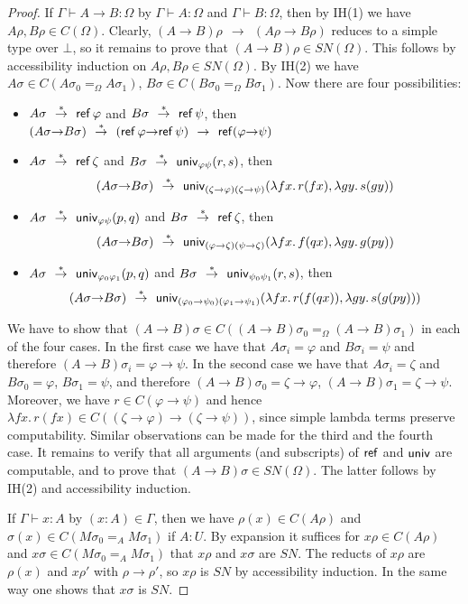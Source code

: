 \documentclass[10pt,a4paper]{article}
\newcommand{\red}{~~{\to}~~}
\newcommand{\unphsi}{{\univ_{\varphi\psi}}}
\newcommand{\unphis}{{\univ_{\varphi_0\varphi_1}}}
\newcommand{\unpsis}{{\univ_{\psi_0\psi_1}}}
\newcommand{\rtr}{~~{\stackrel{*}{\to}}~~}
\newcommand{\SN}{\mathit{SN}}
\newcommand{\Ref}{{\sf ref}}
\newcommand{\univ}{{\sf univ}}
\begin{document}
\begin{proof}
If $\Gamma\vdash {A}\to{B} :\Omega$  by $\Gamma\vdash A:\Omega$ and $\Gamma\vdash B:\Omega$,
then by IH(1) we have $A\rho,B\rho\in C(\Omega)$. Clearly, $(A{\to}B)\rho \red (A\rho{\to}B\rho)$ 
reduces to a simple type over $\bot$, so it remains to prove that $(A{\to}B)\rho\in\SN(\Omega)$.
This follows by accessibility induction on $A\rho,B\rho\in \SN(\Omega)$.
By IH(2) we have $A\sigma\in C(A\sigma_0 =_\Omega A\sigma_1)$, 
$B\sigma\in C(B\sigma_0 =_\Omega B\sigma_1)$. Now there are four possibilities:
\begin{itemize}
\item $A\sigma \rtr \Ref\,\varphi$ and $B\sigma \rtr \Ref\,\psi$,
then $(A\sigma{\to}B\sigma) \rtr (\Ref\,\varphi{\to}\Ref\,\psi) \red \Ref(\varphi{\to}\psi)$
\item $A\sigma \rtr \Ref\,\zeta$   and $B\sigma \rtr \unphsi(r,s)$, then 
\[(A\sigma{\to}B\sigma) \rtr  
\univ_{(\zeta{\to}\varphi)(\zeta{\to}\psi)}(\lambda fx.\,r(fx),\lambda gy.\,s(gy))
\]
\item $A\sigma \rtr \unphsi(p,q)$  and $B\sigma \rtr \Ref\,\zeta$, then 
\[(A\sigma{\to}B\sigma) \rtr  
\univ_{(\varphi{\to}\zeta)(\psi{\to}\zeta)}(\lambda fx.\,f(qx),\lambda gy.\,g(py))
\]
\item $A\sigma \rtr \unphis(p,q)$  and $B\sigma \rtr \unpsis(r,s)$, then 
\[(A\sigma{\to}B\sigma) \rtr  
\univ_{(\varphi_0{\to}\psi_0)(\varphi_1{\to}\psi_1)}(\lambda fx.\,r(f(qx)),\lambda gy.\,s(g(py)))
\]
\end{itemize}
We have to show that $(A{\to}B)\sigma\in C((A{\to}B)\sigma_0 =_\Omega (A{\to}B)\sigma_1)$
in each of the four cases. In the first case we have that $A\sigma_i = \varphi$ and
$B\sigma_i = \psi$ and therefore $(A{\to}B)\sigma_i = \varphi{\to}\psi$.
In the second case we have that $A\sigma_i = \zeta$ and
$B\sigma_0 = \varphi$, $B\sigma_1 = \psi$, and therefore 
$(A{\to}B)\sigma_0 = \zeta{\to}\varphi$,
$(A{\to}B)\sigma_1 = \zeta{\to}\psi$.
Moreover, we have $r\in C(\varphi\to\psi)$ and hence 
$\lambda fx.\,r(fx)\in C((\zeta{\to}\varphi)\to(\zeta{\to}\psi))$,
since simple lambda terms preserve computability.
Similar observations can be made for the third and the fourth case.
It remains to verify that all arguments (and subscripts)
of $\Ref$ and $\univ$ are computable,
and to prove that $(A{\to}B)\sigma\in\SN(\Omega)$. 
The latter follows by IH(2) and accessibility induction.

If $\Gamma\vdash x:A$ by $(x:A)\in\Gamma$, then we have $\rho(x)\in C(A\rho)$
and $\sigma(x)\in C(M \sigma_0  =_A M \sigma_1 )$ if $A:U$. 
By expansion it suffices for $x\rho\in C(A\rho)$
and $x\sigma\in C(M \sigma_0  =_A M \sigma_1 )$ 
that $x\rho$ and $x\sigma$ are $\SN$. The reducts of
$x\rho$ are $\rho(x)$ and $x\rho'$ with $\rho\to\rho'$, 
so $x\rho$ is $\SN$ by accessibility induction. 
In the same way one shows that $x\sigma$ is $\SN$.


\end{proof}
\end{document}
